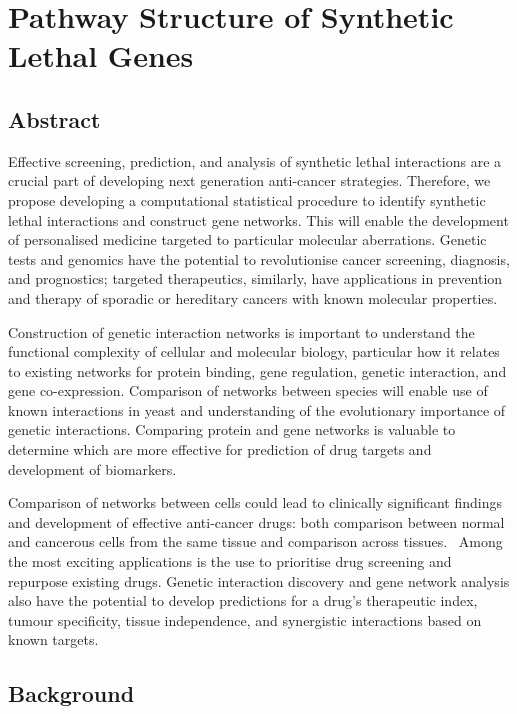 \chapter{Pathway Structure of Synthetic Lethal Genes}
\label{chap:Pathways}

\section{Abstract}

Effective screening, prediction, and analysis of synthetic lethal interactions are a crucial part of developing next generation anti-cancer strategies. Therefore, we propose developing a computational statistical procedure to identify synthetic lethal interactions and construct gene networks. This will enable the development of personalised medicine targeted to particular molecular aberrations. Genetic tests and genomics have the potential to revolutionise cancer screening, diagnosis, and prognostics; targeted therapeutics, similarly, have applications in prevention and therapy of sporadic or hereditary cancers with known molecular properties.

Construction of genetic interaction networks is important to understand the functional complexity of cellular and molecular biology, particular how it relates to existing networks for protein binding, gene regulation, genetic interaction, and gene co-expression. Comparison of networks between species will enable use of known interactions in yeast and understanding of the evolutionary importance of genetic interactions. Comparing protein and gene networks is valuable to determine which are more effective for prediction of drug targets and development of biomarkers.

Comparison of networks between cells could lead to clinically significant findings and development of effective anti-cancer drugs: both comparison between normal and cancerous cells from the same tissue and comparison across tissues. \ Among the most exciting applications is the use to prioritise drug screening and repurpose existing drugs. Genetic interaction discovery and gene network analysis also have the potential to develop predictions for a drug's therapeutic index, tumour specificity, tissue independence, and synergistic interactions based on known targets.

\section{Background}

